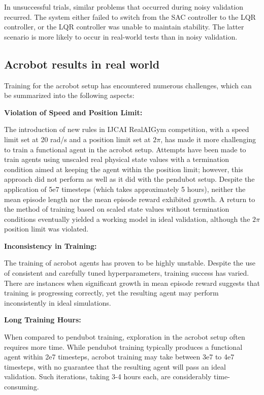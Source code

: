 In unsuccessful trials, similar problems that occurred during noisy validation recurred. The system either failed to switch from the SAC controller to the LQR controller, or the LQR controller was unable to maintain stability. The latter scenario is more likely to occur in real-world tests than in noisy validation.


\subsection{Acrobot results in real world}
Training for the acrobot setup has encountered numerous challenges, which can be summarized into the following aspects:

\textbf{Violation of Speed and Position Limit:}

The introduction of new rules in IJCAI RealAIGym competition\cite{dfki_ric_underactuated_lab_2023}, with a speed limit set at 20 rad/s and a position limit set at \(2\pi\), has made it more challenging to train a functional agent in the acrobot setup. Attempts have been made to train agents using unscaled real physical state values with a termination condition aimed at keeping the agent within the position limit; however, this approach did not perform as well as it did with the pendubot setup. Despite the application of 5e7 timesteps (which takes approximately 5 hours), neither the mean episode length nor the mean episode reward exhibited growth. A return to the method of training based on scaled state values without termination conditions eventually yielded a working model in ideal validation, although the \(2\pi\) position limit was violated.

\textbf{Inconsistency in Training:}

The training of acrobot agents has proven to be highly unstable. Despite the use of consistent and carefully tuned hyperparameters, training success has varied. There are instances when significant growth in mean episode reward suggests that training is progressing correctly, yet the resulting agent may perform inconsistently in ideal simulations.

\textbf{Long Training Hours:}

When compared to pendubot training, exploration in the acrobot setup often requires more time. While pendubot training typically produces a functional agent within 2e7 timesteps, acrobot training may take between 3e7 to 4e7 timesteps, with no guarantee that the resulting agent will pass an ideal validation. Such iterations, taking 3-4 hours each, are considerably time-consuming.

